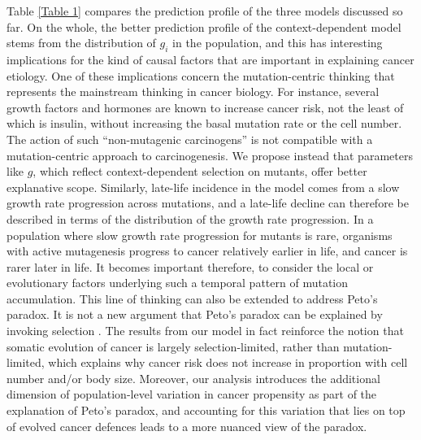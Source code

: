 \documentclass[10pt,twocolumn,twoside]{article}
\begin{document}
Table \ref{Table 1} compares the prediction profile of the three models discussed so far. On the whole, the better prediction profile of the context-dependent model stems from the distribution of $g_{i}$ in the population, and this has interesting implications for the kind of causal factors that are important in explaining cancer etiology. One of these implications concern the mutation-centric thinking that represents the mainstream thinking in cancer biology. For instance, several growth factors and hormones are known to increase cancer risk, not the least of which is insulin, without increasing the basal mutation rate or the cell number. The action of such ``non-mutagenic carcinogens'' is not compatible with a mutation-centric approach to carcinogenesis. We propose instead that parameters like $g$, which reflect context-dependent selection on mutants, offer better explanative scope.
Similarly, late-life incidence in the model comes from a slow growth rate progression across mutations, and a late-life decline can therefore be described in terms of the distribution of the growth rate progression. In a population where slow growth rate progression for mutants is rare, organisms with active mutagenesis progress to cancer relatively earlier in life, and cancer is rarer later in life. It becomes important therefore, to consider the local or evolutionary factors underlying such a temporal pattern of mutation accumulation.
This line of thinking can also be extended to address Peto's paradox. It is not a new argument that Peto's paradox can be explained by invoking selection \cite{Caulin2011,Noble2015,Tollis2017b}. The results from our model in fact reinforce the notion that somatic evolution of cancer is largely selection-limited, rather than mutation-limited, which explains why cancer risk does not increase in proportion with cell number and/or body size. Moreover, our analysis introduces the additional dimension of population-level variation in cancer propensity as part of the explanation of Peto's paradox, and accounting for this variation that lies on top of evolved cancer defences leads to a more nuanced view of the paradox.
\end{document}
